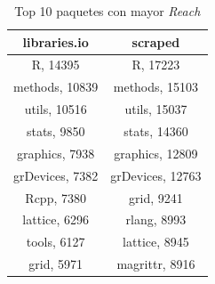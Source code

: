 \begin{table}
    \begin{center}
        \begin{tabular}{|c|c|}
            \hline
            \textbf{libraries.io} & \textbf{scraped} \\
            \hline
            R, 14395              & R, 17223         \\
            methods, 10839        & methods, 15103   \\
            utils, 10516          & utils, 15037     \\
            stats, 9850           & stats, 14360     \\
            graphics, 7938        & graphics, 12809  \\
            grDevices, 7382       & grDevices, 12763 \\
            Rcpp, 7380            & grid, 9241       \\
            lattice, 6296         & rlang, 8993      \\
            tools, 6127           & lattice, 8945    \\
            grid, 5971            & magrittr, 8916   \\
            \hline
        \end{tabular}
        \caption{Top 10 paquetes con mayor \textit{Reach}}
        \label{tab:Top 10 paquetes con mayor Reach}
    \end{center}
\end{table}


